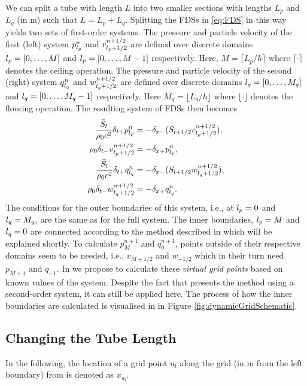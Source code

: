 We can split a tube with length $L$ into two smaller sections with lengths $L_p$ and $L_q$ (in m) such that $L = L_p + L_q$. Splitting the FDSs in \eqref{eq:FDS} in this way yields two sets of first-order systems. The pressure and particle velocity of the first (left) system $p_{l_p}^n$ and $v_{{l_p}+1/2}^{n+1/2}$ are defined over discrete domains ${l_p} = [0, \hdots, M]$ and ${l_p} = [0, \hdots, M-1]$ respectively. Here, $M = \lceil L_p/h\rceil$ where $\lceil \cdot \rceil$ denotes the ceiling operation. The pressure and particle velocity of the second (right) system $q_{l_q}^n$ and $w_{{l_q}+1/2}^{n+1/2}$ are defined over discrete domains ${l_q} = [0, \hdots, M_q]$ and ${l_q} = [0, \hdots, M_q-1]$ respectively. Here $M_q = \lfloor L_q/h\rfloor$ where $\lfloor \cdot \rfloor$ denotes the flooring operation. The resulting system of FDSs then becomes
\begin{subequations}\label{eq:firstOrderPairs}
    \begin{align}
        \frac{\bar S_{l}}{\rho_0 c^2}\delta_{t+}p_{l_p}^n &= -\delta_{x-}(S_{{l}+1/2}v_{{l_p}+1/2}^{n+1/2}),\label{eq:discPressureP}\\
        \rho_0 \delta_{t-}v_{{l_p}+1/2}^{n+1/2}&=-\delta_{x+}p_{l_p}^n,\label{eq:discVelocityV}\\
        \frac{\bar S_{l}}{\rho_0 c^2}\delta_{t+}q_{l_q}^n &= -\delta_{x-}(S_{{l}+1/2}w_{{l_q}+1/2}^{n+1/2}),\label{eq:discPressureQ}\\
        \rho_0 \delta_{t-}w_{{l_q}+1/2}^{n+1/2}&=-\delta_{x+}q_{l_q}^n.\label{eq:discVelocityW}
    \end{align}
\end{subequations}
The conditions for the outer boundaries of this system, i.e., at ${l_p} = 0$ and ${l_q} = M_q$, are the same as for the full system. The inner boundaries, ${l_p} = M$ and ${l_q} = 0$ are connected according to the method described in \cite{Willemsen2021} which will be explained shortly.
To calculate $p_M^{n+1}$ and $q_0^{n+1}$, points outside of their respective domains seem to be needed, i.e., $v_{M+1/2}$ and $w_{-1/2}$ which in their turn need $p_{M+1}$ and $q_{-1}$. In \cite{Willemsen2021} we propose to calculate these \textit{virtual grid points} based on known values of the system. Despite the fact that \cite{Willemsen2021} presents the method using a second-order system, it can still be applied here. The process of how the inner boundaries are calculated is visualised in in Figure \ref{fig:dynamicGridSchematic}.

\subsection{Changing the Tube Length}
In the following, the location of a grid point $u_l$ along the grid (in m from the left boundary) from is denoted as $x_{u_l}$.

